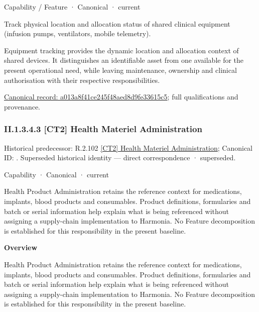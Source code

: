\label{element:a013a8f41ce245f48aed8d9fe33615c5}
{\small Capability / Feature · Canonical · current}\par

Track physical location and allocation status of shared clinical equipment (infusion pumps, ventilators, mobile telemetry).



Equipment tracking provides the dynamic location and allocation context of shared devices. It distinguishes an identifiable asset from one available for the present operational need, while leaving maintenance, ownership and clinical authorisation with their respective responsibilities.


{\footnotesize \href{../../../../continuum/strategy/capability/feature/a013a8f41ce245f48aed8d9fe33615c5.md}{Canonical record: a013a8f41ce245f48aed8d9fe33615c5}; full qualifications and provenance.}\par
\subsubsection*{II.1.3.4.3 [CT2] Health Materiel Administration}
\label{navigation:II.1.3.4.3}

{\small Historical predecessor: R.2.102 \hyperref[element:4952f86078c54a8d898ac992e6f4f577]{[CT2] Health Materiel Administration}; Canonical ID: \texttt{}. Superseded historical identity — direct correspondence · superseded.}\par
\label{element:e7081070a9f8444f81c1d8fce37ef664}
{\small Capability · Canonical · current}\par

Health Product Administration retains the reference context for medications, implants, blood products and consumables. Product definitions, formularies and batch or serial information help explain what is being referenced without assigning a supply-chain implementation to Harmonia. No Feature decomposition is established for this responsibility in the present baseline.



\textbf{Overview}



Health Product Administration retains the reference context for medications, implants, blood products and consumables. Product definitions, formularies and batch or serial information help explain what is being referenced without assigning a supply-chain implementation to Harmonia. No Feature decomposition is established for this responsibility in the present baseline.



